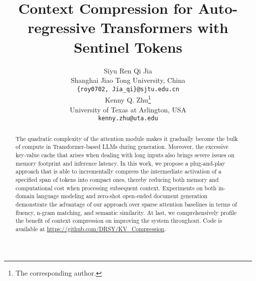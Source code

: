 \documentclass[11pt]{article}
\title{Context Compression for Auto-regressive Transformers with Sentinel Tokens}
\author{Siyu Ren \hspace*{1cm} Qi Jia\\
Shanghai Jiao Tong University, China\\
\texttt{\{roy0702, Jia\_qi\}@sjtu.edu.cn} \\
\And
Kenny Q. Zhu\textsuperscript{\rm}\thanks{\hspace{2mm}The corresponding author.}\\
University of Texas at Arlington, USA\\
\texttt{kenny.zhu@uta.edu} \\
}
\begin{document}
\maketitle
\begin{abstract}
The quadratic complexity of the attention module makes it gradually become the bulk of compute in Transformer-based LLMs during generation. Moreover, the excessive key-value cache that arises when dealing with long inputs also brings severe issues on memory footprint and inference latency. In this work, we propose a plug-and-play approach that is able to incrementally compress the intermediate activation of a specified span of tokens into compact ones, thereby reducing both memory and computational cost when processing subsequent context. 
Experiments on both in-domain language modeling and zero-shot open-ended document generation demonstrate the advantage of our approach over sparse attention baselines in terms of fluency, n-gram matching, and semantic similarity. At last, we comprehensively profile the benefit of context compression on improving the system throughout. Code is available at \url{https://github.com/DRSY/KV_Compression}.
\end{abstract}











\clearpage
\newpage

\end{document}
